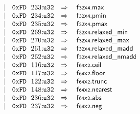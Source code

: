 $$\begin{array}[t]{@{}lrrl@{}l@{}l@{}l@{}}
& & | & \mathtt{0xFD}~~233{:}{\mathtt{u32}} & \quad\Rightarrow\quad{} & {\mathsf{f{\scriptstyle 32}}}{\mathsf{x}}{\mathsf{{\scriptstyle 4}}} {.} \mathsf{max} \\
& & | & \mathtt{0xFD}~~234{:}{\mathtt{u32}} & \quad\Rightarrow\quad{} & {\mathsf{f{\scriptstyle 32}}}{\mathsf{x}}{\mathsf{{\scriptstyle 4}}} {.} \mathsf{pmin} \\
& & | & \mathtt{0xFD}~~235{:}{\mathtt{u32}} & \quad\Rightarrow\quad{} & {\mathsf{f{\scriptstyle 32}}}{\mathsf{x}}{\mathsf{{\scriptstyle 4}}} {.} \mathsf{pmax} \\
& & | & \mathtt{0xFD}~~269{:}{\mathtt{u32}} & \quad\Rightarrow\quad{} & {\mathsf{f{\scriptstyle 32}}}{\mathsf{x}}{\mathsf{{\scriptstyle 4}}} {.} \mathsf{relaxed\_min} \\
& & | & \mathtt{0xFD}~~270{:}{\mathtt{u32}} & \quad\Rightarrow\quad{} & {\mathsf{f{\scriptstyle 32}}}{\mathsf{x}}{\mathsf{{\scriptstyle 4}}} {.} \mathsf{relaxed\_max} \\
& & | & \mathtt{0xFD}~~261{:}{\mathtt{u32}} & \quad\Rightarrow\quad{} & {\mathsf{f{\scriptstyle 32}}}{\mathsf{x}}{\mathsf{{\scriptstyle 4}}} {.} \mathsf{relaxed\_madd} \\
& & | & \mathtt{0xFD}~~262{:}{\mathtt{u32}} & \quad\Rightarrow\quad{} & {\mathsf{f{\scriptstyle 32}}}{\mathsf{x}}{\mathsf{{\scriptstyle 4}}} {.} \mathsf{relaxed\_nmadd} \\
& & | & \mathtt{0xFD}~~116{:}{\mathtt{u32}} & \quad\Rightarrow\quad{} & {\mathsf{f{\scriptstyle 64}}}{\mathsf{x}}{\mathsf{{\scriptstyle 2}}} {.} \mathsf{ceil} \\
& & | & \mathtt{0xFD}~~117{:}{\mathtt{u32}} & \quad\Rightarrow\quad{} & {\mathsf{f{\scriptstyle 64}}}{\mathsf{x}}{\mathsf{{\scriptstyle 2}}} {.} \mathsf{floor} \\
& & | & \mathtt{0xFD}~~122{:}{\mathtt{u32}} & \quad\Rightarrow\quad{} & {\mathsf{f{\scriptstyle 64}}}{\mathsf{x}}{\mathsf{{\scriptstyle 2}}} {.} \mathsf{trunc} \\
& & | & \mathtt{0xFD}~~148{:}{\mathtt{u32}} & \quad\Rightarrow\quad{} & {\mathsf{f{\scriptstyle 64}}}{\mathsf{x}}{\mathsf{{\scriptstyle 2}}} {.} \mathsf{nearest} \\
& & | & \mathtt{0xFD}~~236{:}{\mathtt{u32}} & \quad\Rightarrow\quad{} & {\mathsf{f{\scriptstyle 64}}}{\mathsf{x}}{\mathsf{{\scriptstyle 2}}} {.} \mathsf{abs} \\
& & | & \mathtt{0xFD}~~237{:}{\mathtt{u32}} & \quad\Rightarrow\quad{} & {\mathsf{f{\scriptstyle 64}}}{\mathsf{x}}{\mathsf{{\scriptstyle 2}}} {.} \mathsf{neg} \\

\end{array}$$
